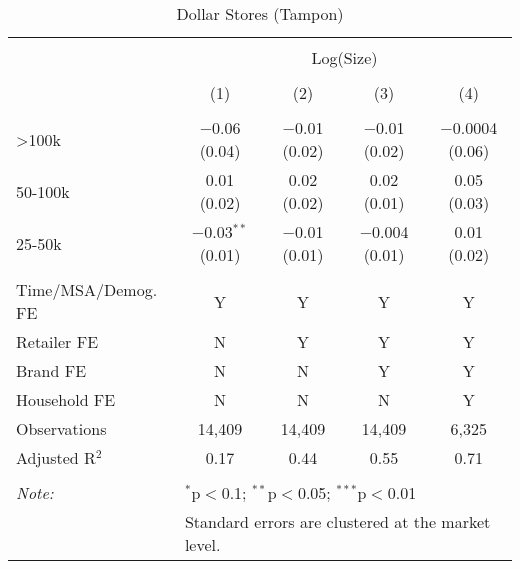 
\begin{table}[!htbp] \centering 
  \caption{Dollar Stores (Tampon)} 
  \label{tab:packageSizeDollarTampon} 
\begin{tabular}{@{\extracolsep{5pt}}lcccc} 
\\[-1.8ex]\hline 
\hline \\[-1.8ex] 
 & \multicolumn{4}{c}{Log(Size)} \\ 
\\[-1.8ex] & (1) & (2) & (3) & (4)\\ 
\hline \\[-1.8ex] 
 >100k & $-$0.06 (0.04) & $-$0.01 (0.02) & $-$0.01 (0.02) & $-$0.0004 (0.06) \\ 
  50-100k & 0.01 (0.02) & 0.02 (0.02) & 0.02 (0.01) & 0.05 (0.03) \\ 
  25-50k & $-$0.03$^{**}$ (0.01) & $-$0.01 (0.01) & $-$0.004 (0.01) & 0.01 (0.02) \\ 
 \hline \\[-1.8ex] 
Time/MSA/Demog. FE & Y & Y & Y & Y \\ 
Retailer FE & N & Y & Y & Y \\ 
Brand FE & N & N & Y & Y \\ 
Household FE & N & N & N & Y \\ 
Observations & 14,409 & 14,409 & 14,409 & 6,325 \\ 
Adjusted R$^{2}$ & 0.17 & 0.44 & 0.55 & 0.71 \\ 
\hline 
\hline \\[-1.8ex] 
\textit{Note:}  & \multicolumn{4}{l}{$^{*}$p$<$0.1; $^{**}$p$<$0.05; $^{***}$p$<$0.01} \\ 
 & \multicolumn{4}{l}{Standard errors are clustered at the market level.} \\ 
\end{tabular} 
\end{table} 
